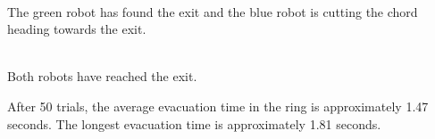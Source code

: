\documentclass[12pt,letterpaper]{article}
\begin{document}
        \begin{center}
             \\
            The green robot has found the exit and the blue robot is cutting the chord heading towards the exit.
        \end{center}

        \begin{center}
             \\
            Both robots have reached the exit.
        \end{center}

        After 50 trials, the average evacuation time in the ring is approximately 1.47 seconds. The longest evacuation time is approximately 1.81 seconds.
        
\end{document}
